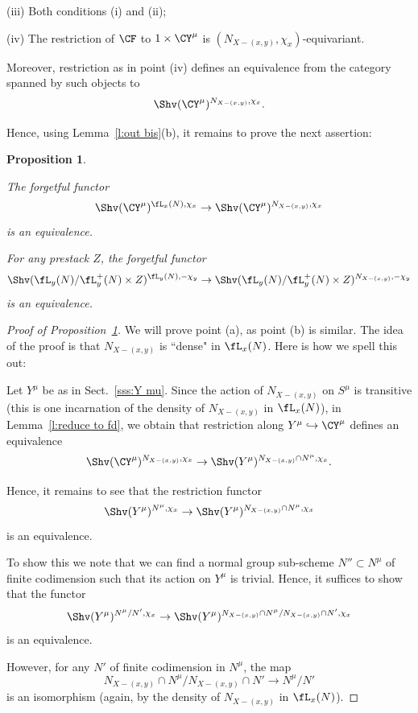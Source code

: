 \documentclass[9pt]{amsart}
\newtheorem{prop}[subsubsection]{Proposition}
\theoremstyle{definition}
\theoremstyle{remark}
\newcommand{\secref}[1]{Sect.~\ref{#1}}
\newcommand{\lemref}[1]{Lemma~\ref{#1}}
\newcommand{\propref}[1]{Proposition~\ref{#1}}
\numberwithin{equation}{section}
\begin{document}
\noindent(iii)  Both conditions (i) and (ii);

\smallskip

\noindent(iv) The restriction of $\CF$ to $1\times \CY^\mu$ is $(N_{X-(x,y)},\chi_x)$-equivariant.

\medskip

Moreover, restriction as in point (iv) defines an equivalence from the category spanned by such objects to
$$\Shv(\CY^\mu)^{N_{X-(x,y)},\chi_x}.$$

\medskip

Hence, using \lemref{l:out bis}(b), it remains to prove the next assertion: 

\begin{prop}   \label{p:skinny equiv} \hfill

The forgetful functor 
$$\Shv(\CY^\mu)^{\fL_x(N),\chi_x}\to \Shv(\CY^\mu)^{N_{X-(x,y)},\chi_x}$$
is an equivalence. 

For any prestack $Z$, the forgetful functor 
$$\Shv(\fL_y(N)/\fL^+_y(N)\times Z)^{\fL_y(N),-\chi_y}\to \Shv(\fL_y(N)/\fL^+_y(N)\times Z)^{N_{X-(x,y)},-\chi_y}$$
is an equivalence.

\end{prop} 

\begin{proof}[Proof of \propref{p:skinny equiv}]

We will prove point (a), as point (b) is similar. 
The idea of the proof is that $N_{X-(x,y)}$ is ``dense" in $\fL_x(N)$. Here is how we spell this out:

\medskip

Let $Y^\mu$ be as in \secref{sss:Y mu}. Since the action of $N_{X-(x,y)}$ on $S^\mu$ is transitive
(this is one incarnation of the density of $N_{X-(x,y)}$ in $\fL_x(N)$), in \lemref{l:reduce to fd}, we obtain that restriction 
along $Y^\mu\hookrightarrow \CY^\mu$ defines
an equivalence
$$\Shv(\CY^\mu)^{N_{X-(x,y)},\chi_x}\to \Shv(Y^\mu)^{N_{X-(x,y)}\cap N^\mu,\chi_x}.$$

Hence, it remains to see that the restriction functor
$$\Shv(Y^\mu)^{N^\mu,\chi_x}\to \Shv(Y^\mu)^{N_{X-(x,y)}\cap N^\mu,\chi_x}$$
is an equivalence.

\medskip

To show this we note that we can find a normal group sub-scheme $N''\subset N^\mu$ of finite codimension such that
its action on $Y^\mu$ is trivial. Hence, it suffices to show that the functor
$$\Shv(Y^\mu)^{N^\mu/N',\chi_x}\to \Shv(Y^\mu)^{N_{X-(x,y)}\cap N^\mu/N_{X-(x,y)}\cap N',\chi_x}$$
is an equivalence.  

\medskip

However, for any $N'$ of finite codimension in $N^\mu$, the map
$$N_{X-(x,y)}\cap N^\mu/N_{X-(x,y)}\cap N'\to N^\mu/N'$$
is an isomorphism (again, by the density of $N_{X-(x,y)}$ in $\fL_x(N)$). 

\end{proof}
\end{document}
